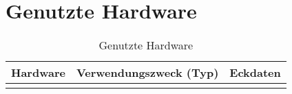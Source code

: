 %
\chapter{Genutzte Hardware}

\begin{table}[!htbp]
\centering
\begin{tabular}{@{}lll@{}}
\toprule
\textbf{Hardware} & \textbf{Verwendungszweck (Typ)} & \textbf{Eckdaten} \\ \midrule
                  &                                 &                   \\
\bottomrule
\end{tabular}%
\caption[Genutzte Hardware]{Genutzte Hardware}
\label{tab:hw}
\end{table}
